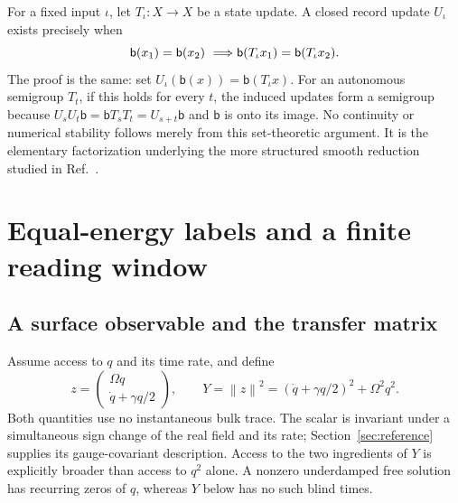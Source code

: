 \documentclass[11pt,a4paper]{article}
\theoremstyle{remark}
\newcommand{\norm}[1]{\left\lVert#1\right\rVert}
\begin{document}
For a fixed input $\iota$, let $T_\iota:X\to X$ be a state update. A
closed record update $U_\iota$ exists precisely when
\begin{equation}
 \mathsf b(x_1)=\mathsf b(x_2)\ \Longrightarrow\\
 \mathsf b(T_\iota x_1)=\mathsf b(T_\iota x_2).
 \label{eq:closure-fibre}
\end{equation}
The proof is the same: set $U_\iota(\mathsf b(x))=\mathsf b(T_\iota x)$.
For an autonomous semigroup $T_t$, if this holds for every $t$, the induced
updates form a semigroup because
$U_s U_t\mathsf b=\mathsf b T_s T_t=U_{s+t}\mathsf b$ and $\mathsf b$
is onto its image. No continuity or numerical stability follows merely
from this set-theoretic argument. It is the elementary factorization
underlying the more structured smooth reduction studied in
Ref.~\cite[Section 2.2]{horstmeyer}.

\section{Equal-energy labels and a finite reading window}
\label{sec:reading}

\subsection{A surface observable and the transfer matrix}

Assume access to $q$ and its time rate, and define
\begin{equation}
 z=\begin{pmatrix}\Omega q\\ \dot q+\gamma q/2\end{pmatrix},
 \qquad Y=\norm{z}^2=(\dot q+\gamma q/2)^2+\Omega^2q^2.
 \label{eq:readout}
\end{equation}
Both quantities use no instantaneous bulk trace. The scalar is invariant
under a simultaneous sign change of the real field and its rate;
Section~\ref{sec:reference} supplies its gauge-covariant description.
Access to the two ingredients of $Y$ is explicitly broader than access
to $q^2$ alone. A nonzero underdamped free solution has recurring zeros
of $q$, whereas $Y$ below has no such blind times.
\end{document}
